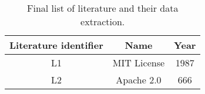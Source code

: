 
\begin{table}[h]
	\begin{center}
		\begin{tabular}{c | c | c} 
			\hline
			Literature identifier & Name & Year\\
			\hline
			L1 & MIT License & 1987 \\
			L2 & Apache 2.0 & 666 \\
		\end{tabular}
		\caption{Final list of literature and their data extraction.}
		\label{table:appendix:c}
	\end{center}
\end{table}